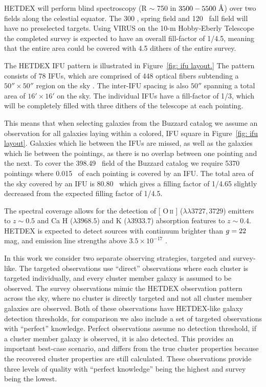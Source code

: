 \documentclass[fleqn,usenatbib]{mnras}
\makeatletter
\DeclareRobustCommand{\ion}[2]{%
\relax\ifmmode
\ifx\testbx\f@series
{\mathbf{#1\,\mathsc{#2}}}\else
{\mathrm{#1\,\mathsc{#2}}}\fi
\else\textup{#1\,{\mdseries\textsc{#2}}}%
\fi}
\makeatother
\begin{document}
HETDEX will perform blind spectroscopy (R $\sim$ 750 in $3500 - 5500~\hbox{\AA}$) over two fields along the celestial equator. The 300 \degsq, spring field and 120 \degsq\ fall field will have no preselected targets. Using VIRUS on the 10-m Hobby-Eberly Telescope \citep{Ramsey1998} the completed survey is expected to have an overall fill-factor of 1/4.5, meaning that the entire area could be covered with 4.5 dithers of the entire survey. 

The HETDEX IFU pattern is illustrated in Figure~\ref{fig: ifu layout.} The pattern consists of 78 IFUs, which are comprised of 448 optical fibers subtending a $50'' \times 50''$ region on the sky \citep{Kelz2014}. The inter-IFU spacing is also $50''$ spanning a total area of $16'\times 16'$ on the sky. The individual IFUs have a fill-factor of 1/3, which will be completely filled with three dithers of the telescope at each pointing. 

This means that when selecting galaxies from the Buzzard catalog we assume an observation for all galaxies laying within a colored, IFU square in Figure~\ref{fig: ifu layout}. Galaxies which lie between the IFUs are missed, as well as the galaxies which lie between the pointings, as there is no overlap between one pointing and the next. To cover the 398.49 \degsq\ field of the Buzzard catalog we require 5370 pointings where 0.015 \degsq\ of each pointing is covered by an IFU. The total area of the sky covered by an IFU is 80.80 \degsq\ which gives a filling factor of 1/4.65 slightly decreased from the expected filling factor of 1/4.5.

The spectral coverage allows for the detection of [\ion{O}{ii}] ($\lambda\lambda 3727,3729$) emitters to $z\sim 0.5$ and Ca H ($\lambda 3968.5$) and K ($\lambda 3933.7$) absorption features to $z\sim 0.4$. HETDEX is expected to detect sources with continuum brighter than $\hbox{$g$}=22$ mag, and emission line strengths above $3.5\times10^{-17}$ \ergscm.

In this work we consider two separate observing strategies, targeted and survey-like. The targeted observations use ``direct'' observations where each cluster is targeted individually, and every cluster member galaxy is assumed to be observed. The survey observations mimic the HETDEX observation pattern across the sky, where no cluster is directly targeted and not all cluster member galaxies are observed. Both of these observations have HETDEX-like galaxy detection thresholds, for comparison we also include a set of targeted observations with ``perfect'' knowledge. Perfect observations assume no detection threshold, if a cluster member galaxy is observed, it is also detected. This provides an important best-case scenario, and differs from the true cluster properties because the recovered cluster properties are still calculated. These observations provide three levels of quality with ``perfect knowledge'' being the highest and survey being the lowest.
\end{document}
